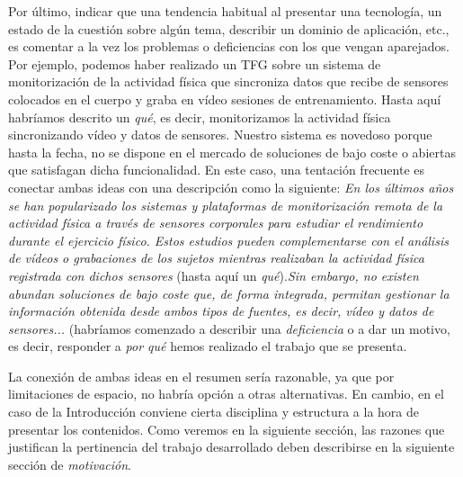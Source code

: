 Por último, indicar que una tendencia habitual al presentar una tecnología, un estado de la cuestión sobre algún tema, describir un dominio de aplicación, etc., es comentar a la vez los problemas o deficiencias con los que vengan aparejados. Por ejemplo, podemos haber realizado un TFG sobre un sistema de monitorización de la actividad física que sincroniza datos que recibe de sensores colocados en el cuerpo y graba en vídeo sesiones de entrenamiento. Hasta aquí habríamos descrito un \textit{qué}, es decir, monitorizamos la actividad física sincronizando vídeo y datos de sensores. Nuestro sistema es novedoso porque hasta la fecha, no se dispone en el mercado de soluciones de bajo coste o abiertas que satisfagan dicha funcionalidad. En este caso, una tentación frecuente es conectar ambas ideas con una descripción como la siguiente: \textit{En los últimos años se han popularizado los sistemas y plataformas de monitorización remota de la actividad física a través de sensores corporales para estudiar el rendimiento durante el ejercicio físico. Estos estudios pueden complementarse con el análisis de vídeos o grabaciones de los sujetos mientras realizaban la actividad física registrada con dichos sensores} (hasta aquí un \textit{qué}).\textit{Sin embargo, no existen abundan soluciones de bajo coste que, de forma integrada, permitan gestionar la información obtenida desde ambos tipos de fuentes, es decir, vídeo y datos de sensores...} (habríamos comenzado a describir una \textit{deficiencia} o a dar un motivo, es decir, responder a \textit{por qué} hemos realizado el trabajo que se presenta.

La conexión de ambas ideas en el resumen sería razonable, ya que por limitaciones de espacio, no habría opción a otras alternativas. En cambio, en el caso de la Introducción conviene cierta disciplina y estructura a la hora de presentar los contenidos. Como veremos en la siguiente sección, las razones que justifican la pertinencia del trabajo desarrollado deben describirse en la siguiente sección de \textit{motivación}.

